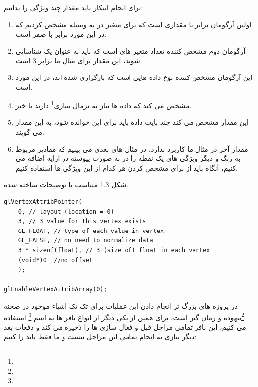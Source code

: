 \documentclass[a4paper, 12pt]{report}
\newcommand{\lrit}[1]{\lr{\textit{#1}}}
\begin{document}
    برای انجام اینکار باید مقدار چند ویژگی را بدانیم:
\begin{persian}
    \begin{enumerate}
      \item اولین آرگومان برابر با مقداری است که برای متغیر  در  به وسیله  مشخص کردیم که در این مورد برابر با صفر است.
      \item آرگومان دوم مشخص کننده تعداد متغیر های است که باید به عنوان یک  شناسایی شوند، این مقدار برای مثال ما برابر 3 است.
      \item این آرگومان مشخص کننده نوع داده هایی است که بارگزاری شده اند، در این مورد  است.
      \item مشخص می کند که داده ها نیاز به نرمال سازی\footnote{} دارند یا خیر.
      \item این مقدار مشخص می کند چند بایت داده باید برای این  خوانده شود، به این مقدار  می گویند.
      \item مقدار آخر در مثال ما کاربرد ندارد، در مثال های بعدی می بینیم که مقادیر مربوط به رنگ و دیگر ویژگی های یک نقطه را در به صورت پیوسته در آرایه  اضافه می کنیم، آنگاه باید از  برای مشخص کردن هر کدام از این ویژگی ها استفاده کنیم.
    \end{enumerate}
\end{persian}

    شکل 1.3 متناسب با توضیحات ساخته شده.

    \begin{LTR}
    \small
        \begin{lstlisting}[style=C++Style,caption=\lrit{link vertex attribute to vertex data}]
glVertexAttribPointer(
    0, // layout (location = 0)
    3, // 3 value for this vertex exists
    GL_FLOAT, // type of each value in vertex
    GL_FALSE, // no need to normalize data
    3 * sizeof(float), // 3 (size of) float in each vertex
    (void*)0  //no offset
    );

glEnableVertexAttribArray(0);
        \end{lstlisting}
    \end{LTR}
    \normalsize
    \vspace*{0.3cm}

    در پروژه های بزرگ تر انجام دادن این عملیات برای تک تک اشیاء موجود در صحنه \footnote{}بیهوده و زمان گیر است، برای همین از یکی دیگر از انواع بافر ها به اسم \footnote{} استفاده می کنیم، این بافر تمامی مراحل قبل و فعال سازی  ها را ذخیره می کند و دفعات بعد دیگر نیازی به انجام تمامی این مراحل نیست و ما فقط باید  را  کنیم:
\end{document}
